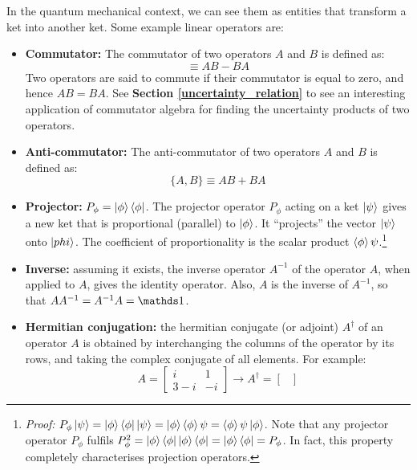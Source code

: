 In the quantum mechanical context, we can see them as entities that transform a ket into another ket. Some example linear operators are:
\begin{itemize}
    \item \textbf{Commutator:} The commutator of two operators $A$ and $B$ is defined as:
    \begin{equation}
        [A, B] \equiv AB - BA
    \end{equation}
    Two operators are said to commute if their commutator is equal to zero, and hence $AB = BA$. See \textbf{Section \ref{uncertainty_relation}} to see an interesting application of commutator algebra for finding the uncertainty products of two operators.
    \item \textbf{Anti-commutator:} The anti-commutator of two operators $A$ and $B$ is defined as:
    \begin{equation}
        \{A, B\} \equiv AB + BA
    \end{equation}
    \item \textbf{Projector:} $P_\phi = \ket{\phi}\bra{\phi}$. The projector operator $P_\phi$ acting on a ket $\ket{\psi}$ gives a new ket that is proportional (parallel) to $\ket{\phi}$. It ``projects'' the vector $\ket{\psi}$ onto $\ket{phi}$. The coefficient of proportionality is the scalar product $\braket{\phi}{\psi}$.\footnote{\textit{Proof:} $P_\phi\ket{\psi} = \ket{\phi}\bra{\phi}\ket{\psi} = \ket{\phi}\braket{\phi}{\psi} = \braket{\phi}{\psi}\ket{\phi}$. Note that any projector operator $P_\phi$ fulfils $P_\phi^2 = \ket{\phi}\bra{\phi}\ket{\phi}\bra{\phi} = \ket{\phi}\bra{\phi} = P_\phi$. In fact, this property completely characterises projection operators.}
    \item \textbf{Inverse:} assuming it exists, the inverse operator $A^{-1}$ of the operator $A$, when applied to $A$, gives the identity operator. Also, $A$ is the inverse of $A^{-1}$, so that $AA^{-1} = A^{-1}A = \Imat$.
    \item \textbf{Hermitian conjugation:} the hermitian conjugate (or adjoint) $A^\dagger$ of an operator $A$ is obtained by interchanging the columns of the operator by its rows, and taking the complex conjugate of all elements. For example:
    \begin{equation}
        A = \begin{bmatrix}
            i & 1 \\
            3-i & -i
        \end{bmatrix}\rightarrow
        A^\dagger = \begin{bmatrix}

\end{bmatrix}
\end{equation}
\end{itemize}
